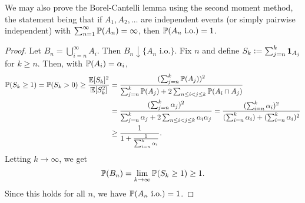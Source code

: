 We may also prove the Borel-Cantelli lemma using the second moment method, the statement being that if $A_{1},A_{2},\ldots$ are independent events (or simply pairwise independent) with $\sum_{n=1}^{\infty} \mathbb{P}(A_{n}) = \infty$, then $\mathbb{P}(A_{n} \text{ i.o.}) = 1$. 
\begin{proof}
    Let $B_{n} = \bigcup_{i=n}^{\infty} A_{i}$. Then $B_{n} \downarrow \{A_{n} \text{ i.o.}\}$. Fix $n$ and define $S_{k} \vcentcolon= \sum_{j=n}^{k} \textbf{1}_{A_{j}}$ for $k \geq n$. Then, with $\mathbb{P}(A_{i}) = \alpha_{i}$,
    \begin{align}
        \mathbb{P}(S_{k} \geq 1) = \mathbb{P}(S_{k} > 0) \geq \frac{\mathbb{E}[S_{k}]^{2}}{\mathbb{E}[S_{k}^{2}]} &= \frac{(\sum_{j=n}^{k} \mathbb{P}(A_{j}))^{2}}{\sum_{j=n}^{k} \mathbb{P}(A_{j}) + 2\sum_{n \leq i < j \leq k} \mathbb{P}(A_{i} \cap A_{j})} \notag \\ &= \frac{(\sum_{j=n}^{k} \alpha_{j})^{2}}{\sum_{j=n}^{k} \alpha_{j} + 2\sum_{n \leq i < j \leq k} \alpha_{i} \alpha_{j}} = \frac{(\sum_{i=n}^{k} \alpha_{i})^{2}}{(\sum_{i=n}^{k} \alpha_{i})+(\sum_{i=n}^{k} \alpha_{i})^{2}} \notag \\ &\geq \dfrac{1}{1+\frac{1}{\sum_{i=n}^{k} \alpha_{i}}}.
    \end{align}
    Letting $k \to \infty$, we get
    \begin{align}
        \mathbb{P}(B_{n}) = \lim_{k \to \infty} \mathbb{P}(S_{k} \geq 1) \geq 1.
    \end{align}
    Since this holds for all $n$, we have $\mathbb{P}(A_{n} \text{ i.o.}) = 1$.
\end{proof}

